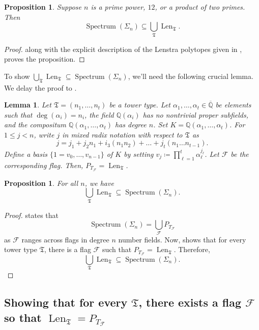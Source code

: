 \documentclass[letterpaper,10pt]{amsart}
\DeclareMathOperator{\Len}{Len}
\DeclareMathOperator{\Spe}{Spectrum}
\newcommand{\QQ}{\mathbb{Q}}      %
\newcommand{\mfT}{\mathfrak{T}}
\newcommand{\cF}{\mathcal{F}}
\newtheorem{lemma}[theorem]{Lemma}
\newtheorem{proposition}[theorem]{Proposition}
\theoremstyle{definition}
\theoremstyle{remark}
\begin{document}
\begin{proposition}
\label{prop:good-n-direction-1}
Suppose $n$ is a prime power, $12$, or a product of two primes. Then 
\[
    \Spe(\Sigma_n) \subseteq \bigcup_{\mfT} \Len_{\mfT}.
\]
\end{proposition}
\begin{proof}
 along with the explicit description of the Lenstra polytopes given in , proves the proposition.
\end{proof}

To show $\bigcup_{\mfT} \Len_{\mfT} \subseteq \Spe(\Sigma_n)$, we'll need the following crucial lemma. We delay the proof to . 

\begin{lemma}
\label{lem:len-T}
Let $\mfT = (n_1,\dots,n_t)$ be a tower type. Let $\alpha_1,\dots,\alpha_{t} \in \overline{\QQ}$ be elements such that $\deg(\alpha_i) = n_i$, the field $\QQ(\alpha_i)$ has no nontrivial proper subfields, and the compositum $\QQ(\alpha_1,\dots,\alpha_t)$ has degree $n$. Set $K = \QQ(\alpha_1,\dots,\alpha_t)$. For $1 \leq j < n$, write $j$ in mixed radix notation with respect to $\mfT$ as
\[
    j = j_1 + j_2 n_1 + i_3 (n_1n_2) + \dots + j_t(n_1\dots n_{t-1}).
\]
Define a basis $\{1 = v_0,\dots,v_{n-1}\}$ of $K$ by setting $v_j \coloneqq \prod_{\ell = 1}^t \alpha_\ell^{j_\ell}$. Let $\cF$ be the corresponding flag. Then, $P_{T_{\cF}} = \Len_{\mfT}$.
\end{lemma}

\begin{proposition}
\label{prop:good-n-direction-2}
For all $n$, we have
\[
    \bigcup_{\mfT} \Len_{\mfT} \subseteq \Spe(\Sigma_n).
\]
\end{proposition}
\begin{proof}
 states that
\[
    \Spe(\Sigma_n) = \bigcup_{\cF} P_{T_{\cF}}
\]
as $\cF$ ranges across flags in degree $n$ number fields. Now,  shows that for every tower type $\mfT$, there is a flag $\cF$ such that $P_{T_{\cF}} = \Len_{\mfT}$. Therefore, 
\[
    \bigcup_{\mfT} \Len_{\mfT} \subseteq \Spe(\Sigma_n).
\]
\end{proof}

\subsection{Showing that for every $\mfT$, there exists a flag $\cF$ so that $\Len_{\mfT} = P_{T_{\cF}}$}
\label{subsec:len-T}
\end{document}
